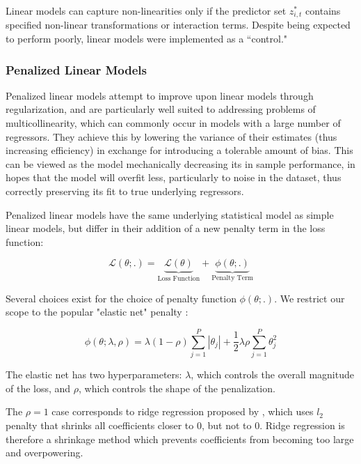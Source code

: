 \documentclass[11pt, a4paper, table]{article}
\begin{document}
Linear models can capture non-linearities only if the predictor set \(z^*_{i, t}\) contains specified non-linear transformations or interaction terms. Despite being expected to perform poorly, linear models were implemented as a ``control."

\subsubsection{Penalized Linear Models}

Penalized linear models attempt to improve upon linear models through regularization, and are particularly well suited to addressing problems of multicollinearity, which can commonly occur in models with a large number of regressors. They achieve this by lowering the variance of their estimates (thus increasing efficiency) in exchange for introducing a tolerable amount of bias. This can be viewed as the model mechanically decreasing its in sample performance, in hopes that the model will overfit less, particularly to noise in the dataset, thus correctly preserving its fit to true underlying regressors.

Penalized linear models have the same underlying statistical model as simple linear models, but differ in their addition of a new penalty term in the loss function:

\begin{equation}
	\mathcal{L(\theta;.)} = 
	\underset{\text{Loss Function}}{\underbrace{\mathcal{L(\theta)}}} + 
	\underset{\text{Penalty Term}}{\underbrace{\phi(\theta;.)}}
\end{equation}

Several choices exist for the choice of penalty function \( \phi(\theta;.) \). We restrict our scope to the popular "elastic net" penalty \citep{zou_regularization_2005}:

\begin{equation}
	\phi(\theta;\lambda,\rho) = 
	\lambda(1-\rho) \sum_{j = 1}^{P}|\theta_j| +
	\frac{1}{2} \lambda \rho \sum_{j = 1}^{P}\theta_j^2
\end{equation}

The elastic net has two hyperparameters: $\lambda$, which controls the overall magnitude of the loss, and $\rho$, which controls the shape of the penalization. 

The $\rho = 1$ case corresponds to ridge regression proposed by \cite{hoerl_ridge_1970}, which uses $l_2$ penalty that shrinks all coefficients closer to 0, but not to 0. Ridge regression is therefore a shrinkage method which prevents coefficients from becoming too large and overpowering. 
\end{document}

